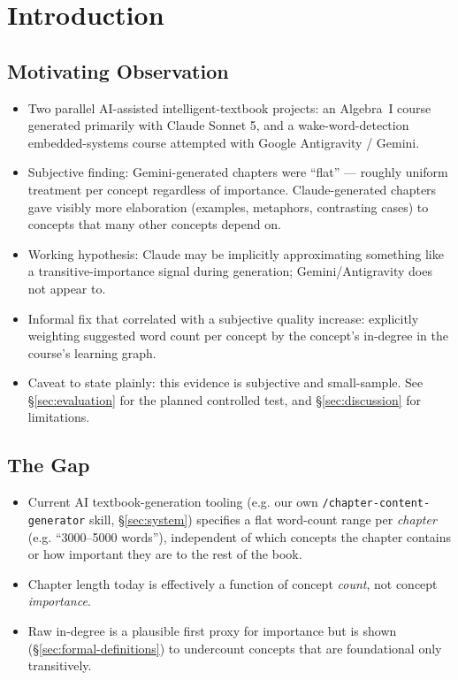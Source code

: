
\section{Introduction}
\label{sec:introduction}

\subsection{Motivating Observation}
\begin{itemize}
    \item Two parallel AI-assisted intelligent-textbook projects: an Algebra~I
          course generated primarily with Claude Sonnet 5, and a wake-word-detection
          embedded-systems course attempted with Google Antigravity / Gemini.
    \item Subjective finding: Gemini-generated chapters were ``flat'' --- roughly
          uniform treatment per concept regardless of importance. Claude-generated
          chapters gave visibly more elaboration (examples, metaphors, contrasting
          cases) to concepts that many other concepts depend on.
    \item Working hypothesis: Claude may be implicitly approximating something like
          a transitive-importance signal during generation; Gemini/Antigravity does
          not appear to.
    \item Informal fix that correlated with a subjective quality increase: explicitly
          weighting suggested word count per concept by the concept's in-degree in
          the course's learning graph.
    \item Caveat to state plainly: this evidence is subjective and small-sample.
          See \S\ref{sec:evaluation} for the planned controlled test, and
          \S\ref{sec:discussion} for limitations.
\end{itemize}

\subsection{The Gap}
\begin{itemize}
    \item Current AI textbook-generation tooling (e.g. our own
          \texttt{/chapter-content-generator} skill, \S\ref{sec:system}) specifies a
          flat word-count range per \emph{chapter} (e.g. ``3000--5000 words''),
          independent of which concepts the chapter contains or how important they
          are to the rest of the book.
    \item Chapter length today is effectively a function of concept \emph{count},
          not concept \emph{importance}.
    \item Raw in-degree is a plausible first proxy for importance but is shown
          (\S\ref{sec:formal-definitions}) to undercount concepts that are
          foundational only transitively.
\end{itemize}

